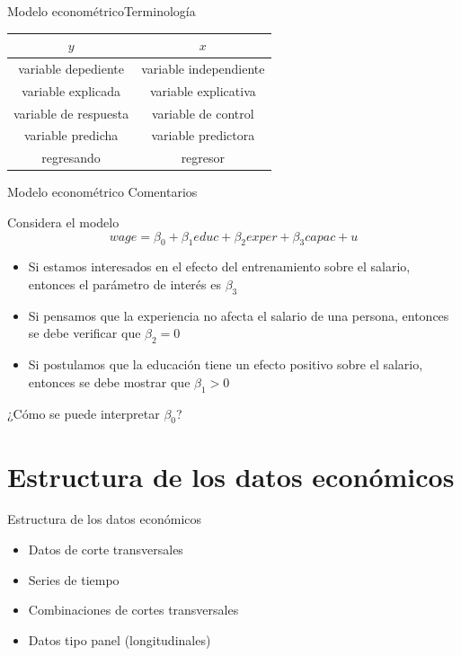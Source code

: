 \documentclass[11pt,handout]{beamer}
\begin{document}
\begin{frame}
{Modelo econométrico}{Terminología}

\begin{center}

\begin{tabular}{|c|c|}
\hline 
$y$ & $x$ \\ 
\hline 
variable depediente & variable independiente \\ 
\hline 
variable explicada & variable explicativa \\ 
\hline 
variable de respuesta & variable de control  \\ 
\hline 
variable predicha & variable predictora \\ 
\hline 
regresando & regresor \\ 
\hline 
\end{tabular} 

\end{center}

\end{frame}

\begin{frame}{Modelo econométrico}
{Comentarios}

Considera el modelo
\[
wage  = \beta_0 + \beta_1 educ  + \beta_2 exper + \beta_3 capac + u
\]

\begin{itemize}[<+->]
	\item Si estamos interesados en el efecto del entrenamiento sobre el salario, entonces el par\'ametro de inter\'es es $\beta_3$
	\item Si pensamos que la experiencia no afecta el salario de una persona, entonces se debe verificar que $\beta_2=0$
	\item Si postulamos que la educaci\'on tiene un efecto positivo sobre el salario, entonces se debe mostrar que $\beta_1>0$
\end{itemize}

\vspace{.25cm}
¿Cómo se puede interpretar $\beta_0$?
\end{frame}

\section{Estructura de los datos económicos}

\begin{frame}{Estructura de los datos econ\'omicos}
\pause
\begin{itemize}[<+->]
	\item Datos de corte transversales
	\item Series de tiempo
	\item Combinaciones de cortes transversales
	\item Datos tipo panel (longitudinales)
\end{itemize}
\end{frame}
\end{document}
